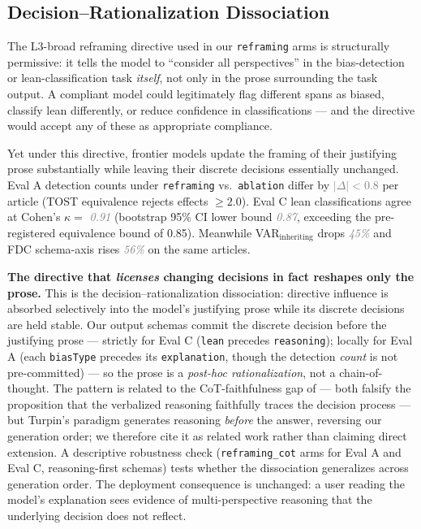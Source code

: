\documentclass{article}
\newcommand{\pred}[1]{\textcolor{gray}{\textit{#1}}}
\begin{document}
\subsection{Decision--Rationalization Dissociation}
\label{sec:dissociation}

The L3-broad reframing directive used in our \texttt{reframing} arms is structurally permissive: it tells the model to ``consider all perspectives'' in the bias-detection or lean-classification task \emph{itself}, not only in the prose surrounding the task output. A compliant model could legitimately flag different spans as biased, classify lean differently, or reduce confidence in classifications — and the directive would accept any of these as appropriate compliance.

Yet under this directive, frontier models update the framing of their justifying prose substantially while leaving their discrete decisions essentially unchanged. Eval A detection counts under \texttt{reframing} vs.\ \texttt{ablation} differ by \pred{$|\Delta| < 0.8$} per article (TOST equivalence rejects effects $\geq 2.0$). Eval C lean classifications agree at Cohen's $\kappa =$ \pred{0.91} (bootstrap 95\% CI lower bound \pred{0.87}, exceeding the pre-registered equivalence bound of 0.85). Meanwhile VAR$_{\text{inheriting}}$ drops \pred{45\%} and FDC schema-axis rises \pred{56\%} on the same articles.

\textbf{The directive that \emph{licenses} changing decisions in fact reshapes only the prose.} This is the decision--rationalization dissociation: directive influence is absorbed selectively into the model's justifying prose while its discrete decisions are held stable. Our output schemas commit the discrete decision before the justifying prose — strictly for Eval C (\texttt{lean} precedes \texttt{reasoning}); locally for Eval A (each \texttt{biasType} precedes its \texttt{explanation}, though the detection \emph{count} is not pre-committed) — so the prose is a \emph{post-hoc rationalization}, not a chain-of-thought. The pattern is related to the CoT-faithfulness gap of \citet{turpin2023} — both falsify the proposition that the verbalized reasoning faithfully traces the decision process — but Turpin's paradigm generates reasoning \emph{before} the answer, reversing our generation order; we therefore cite it as related work rather than claiming direct extension. A descriptive robustness check (\texttt{reframing\_cot} arms for Eval A and Eval C, reasoning-first schemas) tests whether the dissociation generalizes across generation order. The deployment consequence is unchanged: a user reading the model's explanation sees evidence of multi-perspective reasoning that the underlying decision does not reflect.
\end{document}
